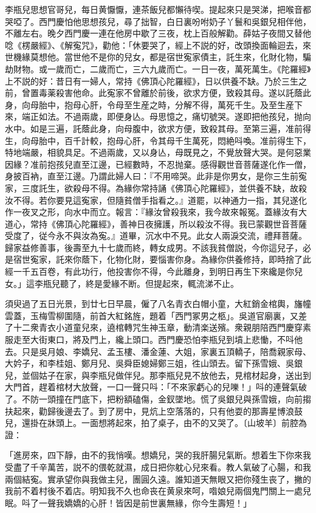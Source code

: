 李瓶兒思想官哥兒，每日黄懨懨，連茶飯兒都懶待喫。提起來只是哭涕，把喉音都哭啞了。西門慶怕他思想孩兒，尋了拙智，白日裏吩咐奶子丫鬟和吳銀兒相伴他，不離左右。晚夕西門慶一連在他房中歇了三夜，枕上百般解勸。薛姑子夜間又替他唸《楞嚴經》、《解寃咒》，勸他：「休要哭了，經上不説的好，改頭換面輪迴去，來世機緣莫想他。當世他不是你的兒女，都是宿世寃家債主，託生來，化財化物，騙劫財物。或一歲而亡，二歲而亡，三六九歲而亡。一日一夜，萬死萬生。《陀羅經》上不説的好：昔日有一婦人，常持《佛頂心陀羅經》，日以供養不缺。乃於三生之前，曾置毒薬殺害他命。此寃家不曾離於前後，欲求方便，致殺其母。遂以託蔭此身，向母胎中，抱母心肝，令母至生産之時，分解不得，萬死千生。及至生産下來，端正如法。不過兩歲，即便身亾。母思憶之，痛切號哭。遂即把他孩兒，抛向水中。如是三遍，託蔭此身，向母腹中，欲求方便，致殺其母。至第三遍，准前得生，向母胎中，百千計較，抱母心肝，令其母千生萬死，悶絶呌喚。准前得生下，特地端嚴，相貌具足。不過兩歲，又以身亾，母既見之，不覺放聲大哭。是何惡業因緣？准前抱孩兒直至江邊，已經數時，不忍抛棄。感得觀世音菩薩遂化作一僧，身披百衲，直至江邊。乃謂此婦人曰：『不用啼哭。此非是你男女，是你三生前寃家，三度託生，欲殺母不得。為緣你常持誦《佛頂心陀羅經》，並供養不缺，故殺汝不得。若你要見這寃家，但隨貧僧手指看之。』道罷，以神通力一指，其兒遂化作一夜叉之形，向水中而立。報言：『緣汝曾殺我來，我今故來報冤。蓋緣汝有大道心，常持《佛頂心陀羅經》，善神日夜擁護，所以殺汝不得。我已蒙觀世音菩薩受度了，従今永不與汝為寃。』道畢，沉水中不見。此女人兩淚交流，禮拜菩薩。歸家益修善事，後壽至九十七歲而終，轉女成男。不該我貧僧説，今你這兒子，必是宿世寃家，託來你蔭下，化物化財，要惱害你身。為緣你供養修持，即時捨了此經一千五百卷，有此功行，他投害你不得，今此離身，到明日再生下來纔是你兒女。」這李瓶兒聽了，終是愛緣不断。但提起來，輒流涕不止。

須臾過了五日光景，到廿七日早晨，僱了八名青衣白帽小童，大紅銷金棺輿，旛幢雲蓋，玉梅雪柳圍隨，前首大紅銘旌，題着「西門冢男之柩」。吳道官廟裏，又差了十二衆青衣小道童兒來，遶棺轉咒生神玉章，動清楽送殯。衆親朋陪西門慶穿素服走至大街東口，將及門上，纔上頭口。西門慶恐怕李瓶兒到墳上悲慟，不呌他去。只是吳月娘、李嬌兒、孟玉樓、潘金蓮、大姐，家裏五頂轎子，陪喬親家母、大妗子，和李桂姐、鄭月兒、吳舜臣媳婦鄭三姐，徃山頭去。留下孫雪娥、吳銀兒，並個姑子在家，與李瓶兒做伴兒。那李瓶兒見不放他去，見棺材起身，送出到大門首，趕着棺材大放聲，一口一聲只呌：「不來家虧心的兒嚛！」呌的連聲氣破了。不防一頭撞在門底下，把粉額磕傷，金釵墜地。慌了吳銀兒與孫雪娥，向前搊扶起來，勸歸後邊去了。到了房中，見炕上空落落的，只有他耍的那壽星博浪鼓兒，還掛在牀頭上。一面想將起來，拍了桌子，由不的又哭了。〔山坡羊〕前腔為證：

\begin{myquote}
「進房來，四下靜，由不的我悄嘆。想嬌兒，哭的我肝腸兒氣断。想着生下你來我受盡了千辛萬苦，説不的偎乾就濕，成日把你躭心兒來看。教人氣破了心腸，和我兩個結寃。實承望你與我做主兒，團圓久遠。誰知道天無眼又把你殘生丧了，撇的我前不着村後不着店。明知我不久也命丧在黄泉來呵，喒娘兒兩個鬼門關上一處兒眠。呌了一聲我嬌嬌的心肝！皆因是前世裏無緣，你今生壽短！」
\end{myquote}

